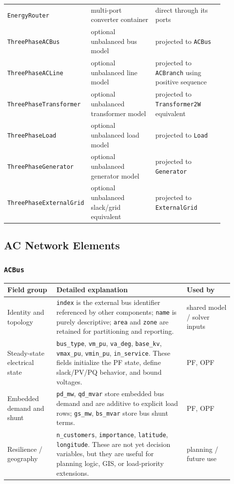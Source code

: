 \begin{longtable}{L{0.23\linewidth}L{0.32\linewidth}L{0.33\linewidth}}
\texttt{EnergyRouter} & multi-port converter container & direct through its ports \\
\texttt{ThreePhaseACBus} & optional unbalanced bus model & projected to \texttt{ACBus} \\
\texttt{ThreePhaseACLine} & optional unbalanced line model & projected to \texttt{ACBranch} using positive sequence \\
\texttt{ThreePhaseTransformer} & optional unbalanced transformer model & projected to \texttt{Transformer2W} equivalent \\
\texttt{ThreePhaseLoad} & optional unbalanced load model & projected to \texttt{Load} \\
\texttt{ThreePhaseGenerator} & optional unbalanced generator model & projected to \texttt{Generator} \\
\texttt{ThreePhaseExternalGrid} & optional unbalanced slack/grid equivalent & projected to \texttt{ExternalGrid} \\
\bottomrule
\end{longtable}

\subsection{AC Network Elements}

\subsubsection*{\texttt{ACBus}}
\begin{longtable}{L{0.20\linewidth}L{0.53\linewidth}L{0.19\linewidth}}
\toprule
Field group & Detailed explanation & Used by \\
\midrule
\endhead
Identity and topology & \texttt{index} is the external bus identifier referenced by other components; \texttt{name} is purely descriptive; \texttt{area} and \texttt{zone} are retained for partitioning and reporting. & shared model / solver inputs \\
Steady-state electrical state & \texttt{bus\_type}, \texttt{vm\_pu}, \texttt{va\_deg}, \texttt{base\_kv}, \texttt{vmax\_pu}, \texttt{vmin\_pu}, \texttt{in\_service}.  These fields initialize the PF state, define slack/PV/PQ behavior, and bound voltages. & PF, OPF \\
Embedded demand and shunt & \texttt{pd\_mw}, \texttt{qd\_mvar} store embedded bus demand and are additive to explicit load rows; \texttt{gs\_mw}, \texttt{bs\_mvar} store bus shunt terms. & PF, OPF \\
Resilience / geography & \texttt{n\_customers}, \texttt{importance}, \texttt{latitude}, \texttt{longitude}.  These are not yet decision variables, but they are useful for planning logic, GIS, or load-priority extensions. & planning / future use \\
\bottomrule
\end{longtable}

